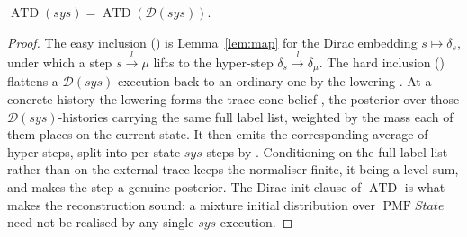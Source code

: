 \begin{theorem}
  \label{thm:dist-eq}
  \leanok
  $\operatorname{ATD}(sys) = \operatorname{ATD}(\mathcal{D}(sys))$.
\end{theorem}

\begin{proof}\leanok
  The easy inclusion () is Lemma~\ref{lem:map} for the Dirac embedding $s \mapsto \delta_s$, under which a step $s \xrightarrow{l} \mu$ lifts to the hyper-step $\delta_s \xrightarrow{l} \delta_\mu$.
  The hard inclusion () flattens a $\mathcal{D}(sys)$-execution back to an ordinary one by the lowering .
  At a concrete history the lowering forms the trace-cone belief , the posterior over those $\mathcal{D}(sys)$-histories carrying the same full label list, weighted by the mass each of them places on the current state.
  It then emits the corresponding average of hyper-steps, split into per-state $sys$-steps by .
  Conditioning on the full label list rather than on the external trace keeps the normaliser finite, it being a level sum, and makes the step a genuine posterior.
  The Dirac-init clause of $\operatorname{ATD}$ is what makes the reconstruction sound: a mixture initial distribution over $\operatorname{PMF} State$ need not be realised by any single $sys$-execution.
\end{proof}
